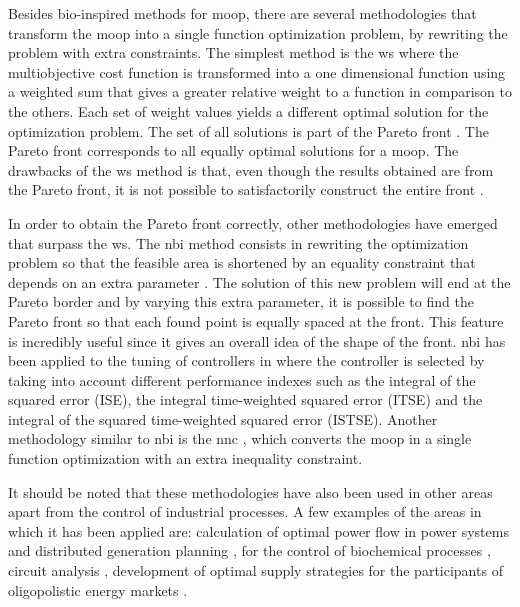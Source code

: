 Besides bio-inspired methods for \gls{moop}, there are several methodologies that transform the \gls{moop} into a single function optimization problem, by rewriting the problem with extra constraints. The simplest method is the \gls{ws} \citep{Marler2004} where the multiobjective cost function is transformed into a one dimensional function using a weighted sum that gives a greater relative weight to a function in comparison to the others. Each set of weight values yields a different optimal solution for the optimization problem. The set of all solutions is part of the Pareto front \citep{Marler2004}. The Pareto front corresponds to all equally optimal solutions for a \gls{moop}. The drawbacks of the \gls{ws} method is that, even though the results obtained are from the Pareto front, it is not possible to satisfactorily construct the entire front \citep{Das1997,Messac2000,Marler2010}.

In order to obtain the Pareto front correctly, other methodologies have emerged that surpass the \gls{ws}. The \gls{nbi} method consists in rewriting the optimization problem so that the feasible area is shortened by an equality constraint that depends on an extra parameter \citep{Das1998}. The solution of this new problem will end at the Pareto border and by varying this extra parameter, it is possible to find the Pareto front so that each found point is equally spaced at the front. This feature is incredibly useful since it gives an overall idea of the shape of the front. \gls{nbi} has been applied to the tuning of controllers in \citet{Gambier2009} where the controller is selected by taking into account different performance indexes such as the integral of the squared error (ISE), the integral time-weighted squared error (ITSE) and the integral of the squared time-weighted squared error (ISTSE). Another methodology similar to \gls{nbi} is the \gls{nnc} \citep{Messac2003}, which converts the \gls{moop} in a single function optimization with an extra inequality constraint.

It should be noted that these methodologies have also been used in other areas apart from the control of industrial processes. A few examples of the areas in which it has been applied are: calculation of optimal power flow in power systems \citep{Roman2006}  and distributed generation planning \citep{Zangeneh2007},  for the control of biochemical processes \citep{Logist2009}, circuit analysis \citep{Stehr2003}, development of optimal supply strategies for the participants of oligopolistic energy markets \citep{Vahidinasab2010}.

